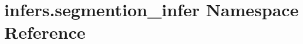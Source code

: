 \hypertarget{namespaceinfers_1_1segmention__infer}{}\section{infers.\+segmention\+\_\+infer Namespace Reference}
\label{namespaceinfers_1_1segmention__infer}

